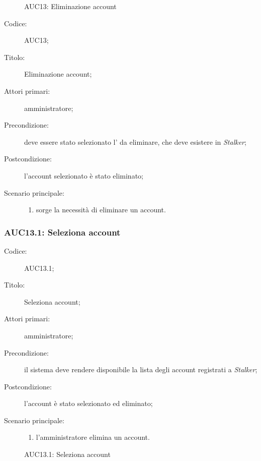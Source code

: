 \documentclass[../../../analisi-dei-requisiti.tex]{subfiles}
\begin{document}
\begin{figure}[H]
  \centering
  \caption{AUC13: Eliminazione account}%
  \label{fig:AUC13}
\end{figure}

\begin{description}
  \item[Codice:] AUC13;
  \item[Titolo:] Eliminazione account;
  \item[Attori primari:] amministratore;
  \item[Precondizione:] deve essere stato selezionato l' da eliminare, che deve esistere in \emph{Stalker};
  \item[Postcondizione:] l'account selezionato è stato eliminato;
  \item[Scenario principale:]
  \begin{enumerate}
    \item sorge la necessità di eliminare un account.
  \end{enumerate}
\end{description}

\subsubsection{AUC13.1: Seleziona account}%
\label{subs:AUC13.1}
\begin{description}
  \item[Codice:] AUC13.1;
  \item[Titolo:] Seleziona account;
  \item[Attori primari:] amministratore;
  \item[Precondizione:] il sistema deve rendere disponibile la lista degli account registrati a \emph{Stalker};
  \item[Postcondizione:] l'account è stato selezionato ed eliminato;
  \item[Scenario principale:]
  \begin{enumerate}
    \item l'amministratore elimina un account.
  \end{enumerate}
\end{description}

\begin{figure}[H]
  \centering
  \caption{AUC13.1: Seleziona account}%
  \label{fig:AUC13.1}
\end{figure}
\end{document}
